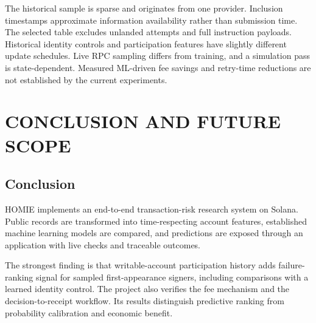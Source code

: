 \documentclass[12pt,a4paper,oneside]{report}
\begin{document}
The historical sample is sparse and originates from one provider. Inclusion timestamps approximate information availability rather than submission time. The selected table excludes unlanded attempts and full instruction payloads. Historical identity controls and participation features have slightly different update schedules. Live RPC sampling differs from training, and a simulation pass is state-dependent. Measured ML-driven fee savings and retry-time reductions are not established by the current experiments.
\chapter{CONCLUSION AND FUTURE SCOPE}
\section{Conclusion}
HOMIE implements an end-to-end transaction-risk research system on Solana. Public records are transformed into time-respecting account features, established machine learning models are compared, and predictions are exposed through an application with live checks and traceable outcomes.

The strongest finding is that writable-account participation history adds failure-ranking signal for sampled first-appearance signers, including comparisons with a learned identity control. The project also verifies the fee mechanism and the decision-to-receipt workflow. Its results distinguish predictive ranking from probability calibration and economic benefit.
\end{document}
